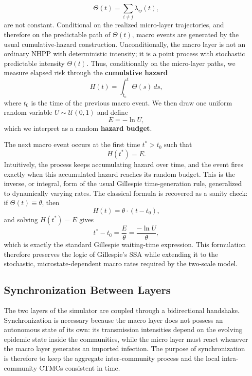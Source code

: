 \documentclass[a4paper,fleqn]{cas-sc}
\newcommand{\ReadStatusTwo}[5]{}
\begin{document}
\[
\Theta(t)=\sum_{i\neq j}\lambda_{ij}(t),
\]
are not constant. Conditional on the realized micro-layer trajectories, and therefore on the predictable path of \(\Theta(t)\), macro events are generated by the usual cumulative-hazard construction. Unconditionally, the macro layer is not an ordinary NHPP with deterministic intensity; it is a point process with stochastic predictable intensity \(\Theta(t)\). Thus, conditionally on the micro-layer paths, we measure elapsed risk through the \textbf{cumulative hazard}
\[
H(t)=\int_{t_0}^{t}\Theta(s)\,ds,
\]
where \(t_0\) is the time of the previous macro event. We then draw one uniform random variable \(U\sim\mathcal U(0,1)\) and define
\[
E=-\ln U,
\]
which we interpret as a random \textbf{hazard budget}. 

The next macro event occurs at the first time \(t^\ast>t_0\) such that
\[
H(t^\ast)=E.
\]
Intuitively, the process keeps accumulating hazard over time, and the event fires exactly when this accumulated hazard reaches its random budget. This is the inverse, or integral, form of the usual Gillespie time-generation rule, generalized to dynamically varying rates. The classical formula is recovered as a sanity check: if \(\Theta(t)\equiv \theta\), then
\[
H(t)=\theta \cdot (t-t_0),
\]
and solving \(H(t^\ast)=E\) gives
\[
t^\ast-t_0=\frac{E}{\theta}=\frac{-\ln U}{\theta},
\]
which is exactly the standard Gillespie waiting-time expression. This formulation therefore preserves the logic of Gillespie's SSA while extending it to the stochastic, microstate-dependent macro rates required by the two-scale model.


\subsection{Synchronization Between Layers}
\ReadStatusTwo{Synchronization Between Layers}{Yulian}{1}{Michael}{0}

The two layers of the simulator are coupled through a bidirectional handshake. Synchronization is necessary because the macro layer does not possess an autonomous state of its own: its transmission intensities depend on the evolving epidemic state inside the communities, while the micro layer must react whenever the macro layer generates an imported infection. The purpose of synchronization is therefore to keep the aggregate inter-community process and the local intra-community CTMCs consistent in time.
\end{document}
